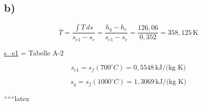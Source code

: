 

\subsection*{b)}

\[
\overline{T} = \frac{\int T \, ds}{s_{e1} - s_c} = \frac{h_q - h_e}{s_{e1} - s_c} = \frac{126,06}{0,352} = 358,125 \, \text{K}
\]

\underline{s_{e1}} = Tabelle A-2

\[
s_{e1} = s_f (700^\circ C) = 0,5548 \, \text{kJ/(kg K)}
\]

\[
s_q = s_f (1000^\circ C) = 1,3069 \, \text{kJ/(kg K)}
\]

``````latex